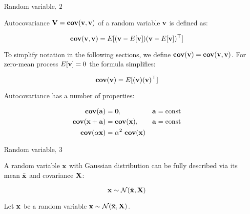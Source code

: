 \documentclass{beamer}
\begin{document}
\begin{frame}{Random variable, 2}
	\begin{flushleft}
		
		Autocovariance $\mathbf{V} = \textbf{cov}(\mathbf{v}, \mathbf{v})$ of a random variable $\mathbf{v}$ is defined as:
		
		\begin{equation}
			\textbf{cov}(\mathbf{v}, \mathbf{v}) = E[(\mathbf{v} - E[\mathbf{v}])(\mathbf{v} - E[\mathbf{v}])^\top]
		\end{equation}
	
		To simplify notation in the following sections, we define $\textbf{cov}(\mathbf{v}) = \textbf{cov}(\mathbf{v}, \mathbf{v})$. For zero-mean process $E[\mathbf{v}] = 0$ the formula simplifies:
		
		\begin{equation}
			\textbf{cov}(\mathbf{v}) = E[(\mathbf{v})(\mathbf{v})^\top]
		\end{equation}
		
		Autocovariance has a number of properties:
		
		\begin{align}
			\textbf{cov}(\bo{a}) &= \bo{0}, & \bo{a}= \text{const} 
			\\
			\textbf{cov}(\bo{x}+\bo{a}) &= \textbf{cov}(\bo{x}), & \bo{a}= \text{const} 
			\\
			\textbf{cov}(\alpha \bo{x}) &= \alpha^2 \ \textbf{cov}(\bo{x}) &
		\end{align}
		
		
		
	\end{flushleft}
\end{frame}




\begin{frame}{Random variable, 3}
	\begin{flushleft}
		
		A random variable $\mathbf{x}$ with Gaussian distribution can be fully described via its mean $\bar{\mathbf{x}}$ and covariance $\mathbf{X}$:
		
		\begin{equation}
			\mathbf{x} \sim \mathcal{N} (\bar{\mathbf{x}}, \mathbf{X})
		\end{equation}
	
		Let $\mathbf{x}$ be a random variable $\mathbf{x} \sim \mathcal{N} (\bar{\mathbf{x}}, \mathbf{X})$. 
		
		
	\end{flushleft}
\end{frame}
\end{document}
